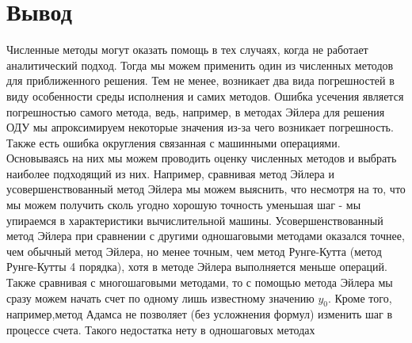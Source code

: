 \documentclass[11pt, english]{article}
\begin{document}
    \section{Вывод}
    Численные методы могут оказать помощь в тех случаях, когда не работает аналитический подход. Тогда мы можем применить один из численных методов для приближенного решения.
    \newline\newline
    Тем не менее, возникает два вида погрешностей в виду особенности среды исполнения и самих методов. Ошибка усечения является погрешностью самого метода, ведь, например, в методах Эйлера для решения ОДУ мы апроксимируем некоторые значения из-за чего возникает погрешность. Также есть ошибка округления связанная с машинными операциями.
    \newline\newline
    Основываясь на них мы можем проводить оценку численных методов и выбрать наиболее подходящий из них.
    \newline\newline
    Например, сравнивая метод Эйлера и усовершенствованный метод Эйлера мы можем выяснить, что несмотря на то, что мы можем получить сколь угодно хорошую точность уменьшая шаг - мы упираемся в характеристики вычислительной машины.
    \newline\newline
    Усовершенствованный метод Эйлера при сравнении с другими одношаговыми методами оказался точнее, чем обычный метод Эйлера, но менее точным, чем метод Рунге-Кутта (метод Рунге-Кутты 4 порядка), хотя в методе Эйлера выполняется меньше операций.
    \newline\newline
    Также сравнивая с многошаговыми методами, то с помощью метода Эйлера мы сразу можем начать счет по одному лишь известному значению $y_0$. Кроме того, например,метод Адамса не позволяет (без усложнения формул) изменить шаг в процессе счета. Такого недостатка нету в одношаговых методах
\end{document}

